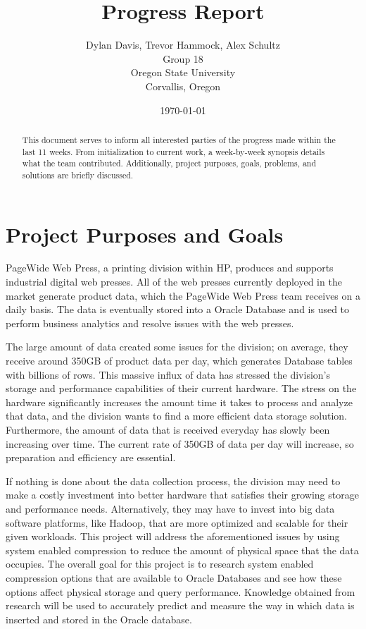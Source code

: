 \documentclass[10pt]{article}
\title{Progress Report}
\author{
	Dylan Davis, Trevor Hammock, Alex Schultz \\
    Group 18 \\
	Oregon State University\\
	Corvallis, Oregon
}
\date{\today}
\begin{document}
\begin{titlingpage}
\maketitle

\begin{abstract}
This document serves to inform all interested parties of the progress made within the last 11 weeks. From initialization to current work, a week-by-week synopsis details what the team contributed. Additionally, project purposes, goals, problems, and solutions are briefly discussed.
\end{abstract}
\end{titlingpage}


\tableofcontents
\clearpage

\section{Project Purposes and Goals}
PageWide Web Press, a printing division within HP, produces and supports industrial digital web presses. All of the web presses currently deployed  in the market generate product data, which the PageWide Web Press team receives on a daily basis. The data is eventually stored into a Oracle Database and is used to perform business analytics and resolve issues with the web presses.

The large amount of data created some issues for the division; on average, they receive around 350GB of product data per day, which generates Database tables with billions of rows. This massive influx of data has stressed the division's storage and performance capabilities of their current hardware. The stress on the hardware significantly increases the amount time it takes to process and analyze that data, and the division wants to find a more efficient data storage solution. Furthermore, the amount of data that is received everyday has slowly been increasing over time. The current rate of 350GB of data per day will increase, so preparation and efficiency are essential.

If nothing is done about the data collection process, the division may need to make a costly investment into better hardware that satisfies their growing storage and performance needs. Alternatively, they may have to invest into big data software platforms, like Hadoop, that are more optimized and scalable for their given workloads. This project will address the aforementioned issues by using system enabled compression to reduce the amount of physical space that the data occupies. The overall goal for this project is to research system enabled compression options that are available to Oracle Databases and see how these options affect physical storage and query performance. Knowledge obtained from research will be used to accurately predict and measure the way in which data is inserted and stored in the Oracle database.
\end{document}
